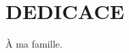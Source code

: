 \chapter*{DEDICACE}
\thispagestyle{MyStyle}
%
\begin{center}
{\huge À} ma famille. 
\end{center}
\nopagebreak{%
  \raggedright\hspace{5.75cm} 
  \vspace{-2cm}
  \raggedleft\normalfont\large\itshape{} \reportAuthor\par%
}